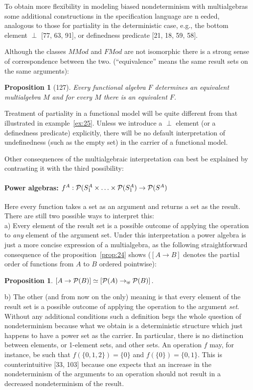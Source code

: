 \documentclass[10pt]{article}
\newcommand{\PSet}{{\cal P}}
\newcommand{\into}{\mathrel{\rightarrow}}
\newcommand{\addstrinto}{\mathrel{\rightarrow_{\uplus}}}
\newcommand{\iso}{\mathrel{\simeq}}
\newcounter{CLAIM}[section]
\newtheorem{Claim}[CLAIM]{Proposition}
\begin{document}
\noindent
To obtain more flexibility in modeling biased 
nondeterminism with multialgebras some additional constructions in 
the specification language are n
eeded, analogous to those for partiality in the deterministic case, 
e.g., the bottom element $\perp$ [77, 63, 91], or definedness 
predicate [21, 18, 59, 58].

 Although the classes $MMod$ and 
$FMod$ are not isomorphic there is a strong sense of correspondence 
between the two. (``equivalence'' means the same result sets on the 
same arguments):
\begin{Claim}[127] %
Every functional algebra $F$ 
determines an equivalent multialgebra $M$ and for every $M$ there is an 
equivalent $F$.
\end{Claim}

\noindent
Treatment of partiality in a functional model 
will be quite different from that illustrated in example~\ref{ex:25}. Unless 
we introduce a $\perp$
 element (or a definedness predicate) explicitly, there will be no 
default interpretation of undefinedness (such as the empty set) in 
the carrier of a functional model. 

Other consequences of the 
multialgebraic interpretation can best be explained by contrasting it 
with the third possibility: 

\paragraph{ Power algebras: 
$f^{A}:\PSet(S_{1}^{A}\times\ldots\times\PSet(S_{1}^{A}) \into 
\PSet(S^{A})$}
Here every function takes a set as 
an argument and returns a set as the result. There are still two 
possible ways to interpret this: \\[1ex]
a) Every element of the result set is a 
possible outcome of applying the operation to {\em any}
 element of the argument set. Under this interpretation a power 
algebra is just a more concise expression of a multialgebra, as the 
following straightforward consequence of the proposition~\ref{prop:24} shows 
($[A\into B]$ denotes the partial order of functions from $A$ to $B$ 
ordered pointwise): 

\begin{Claim}\label{prop:27} %
$[A\into \PSet(B)] \iso [\PSet(A)\addstrinto \PSet(B)]$.
\end{Claim}

\noindent
b) The other (and from now on 
the only) meaning is that every element of the result set is a 
possible outcome of applying the operation to the argument {\em set}. 
Without any additional conditions such a definition begs the whole 
question of nondeterminism because what we obtain is a deterministic 
structure which just happens to have a power set as the carrier. In 
particular, there is no distinction between elements,
or 1-element sets, and other sets. An operation $f$ may, for 
instance, be such that $f(\{0,1,2\}) = \{0\}$ and $f(\{0\}) = \{0,1\}$. 
This is counterintuitive [33, 103] because one expects that an increase in the nondeterminism 
of the arguments to an operation should not result in a decreased 
nondeterminism of the result.
\end{document}

